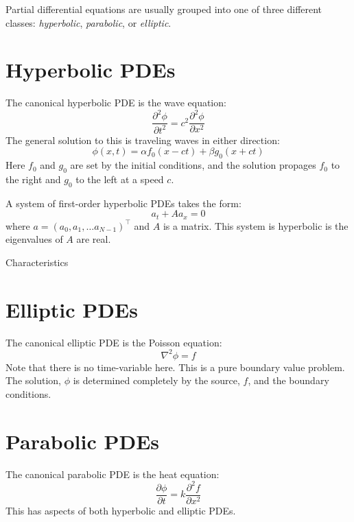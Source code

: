Partial differential equations are usually grouped into one of 
three different classes: {\em hyperbolic}, {\em parabolic}, 
or {\em elliptic}.


\section{Hyperbolic PDEs}

The canonical hyperbolic PDE is the wave equation:
\begin{equation}
  \frac{\partial^2 \phi}{\partial t^2} = c^2 \frac{\partial^2 \phi}{\partial x^2}
\end{equation}   
The general solution to this is traveling waves in either direction:
\begin{equation}
  \phi(x,t) = \alpha f_0(x - ct) + \beta g_0(x + ct)
\end{equation}
Here $f_0$ and $g_0$ are set by the initial
conditions, and the solution propages $f_0$ to the right and $g_0$ to
the left at a speed $c$.

A system of first-order hyperbolic PDEs takes the form:
\begin{equation}
a_t + A a_x = 0
\end{equation}
where $a = (a_0, a_1, \ldots a_{N-1})^\intercal$ and $A$ is a matrix.
This system is hyperbolic is the eigenvalues of $A$ are real.

Characteristics


\section{Elliptic PDEs}

The canonical elliptic PDE is the Poisson equation:
\begin{equation}
  \nabla^2 \phi = f
\end{equation}
Note that there is no time-variable here.  This is a pure boundary
value problem.  The solution, $\phi$ is determined completely by the
source, $f$, and the boundary conditions.


\section{Parabolic PDEs}

The canonical parabolic PDE is the heat equation:
\begin{equation}
  \frac{\partial \phi}{\partial t} = k \frac{\partial^2 f}{\partial x^2}
\end{equation}
This has aspects of both hyperbolic and elliptic PDEs.



